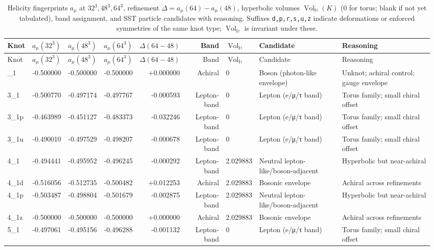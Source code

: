 \documentclass[smallextended]{svjour3}       %
\newcommand{\Vol}{\operatorname{Vol}}   %
\begin{document}
    \begin{longtable}{lrrrrrllp{6.8cm}}
    \caption{Helicity fingerprints $a_\mu$ at $32^3,48^3,64^3$, refinement $\Delta=a_\mu(64)-a_\mu(48)$, hyperbolic volumes $\Vol_{\!\mathbb{H}}(K)$ (0 for torus; blank if not yet tabulated), band assignment, and SST particle candidates with reasoning. Suffixes \texttt{d,p,r,s,u,z} indicate deformations or enforced symmetries of the same knot type; $\Vol_{\!\mathbb{H}}$ is invariant under these.}\\
    \toprule
    Knot & $a_\mu(32^3)$ & $a_\mu(48^3)$ & $a_\mu(64^3)$ & $\Delta(64{-}48)$ & Band & $\Vol_{\!\mathbb{H}}$ & Candidate & Reasoning \\
    \midrule
    \endfirsthead
    \toprule
    Knot & $a_\mu(32^3)$ & $a_\mu(48^3)$ & $a_\mu(64^3)$ & $\Delta(64{-}48)$ & Band & $\Vol_{\!\mathbb{H}}$ & Candidate & Reasoning \\
    \midrule
    \endhead
    \bottomrule
    \endlastfoot
    1\_1 & -0.500000 & -0.500000 & -0.500000 & +0.000000 & Achiral & 0 & Boson (photon-like envelope) & Unknot; achiral control; gauge envelope \\
    3\_1 & -0.500770 & -0.497174 & -0.497767 & -0.000593 & Lepton-band & 0 & Lepton (e/μ/τ band) & Torus family; small chiral offset \\
    3\_1p & -0.463989 & -0.451127 & -0.483373 & -0.032246 & Lepton-band & 0 & Lepton (e/μ/τ band) & Torus family; small chiral offset \\
    3\_1u & -0.490010 & -0.497529 & -0.498207 & -0.000678 & Lepton-band & 0 & Lepton (e/μ/τ band) & Torus family; small chiral offset \\
    4\_1 & -0.494441 & -0.495952 & -0.496245 & -0.000292 & Lepton-band & 2.029883 & Neutral lepton-like/boson-adjacent & Hyperbolic but near-achiral \\
    4\_1d & -0.516056 & -0.512735 & -0.500482 & +0.012253 & Achiral & 2.029883 & Bosonic envelope & Achiral across refinements \\
    4\_1p & -0.503487 & -0.498804 & -0.501679 & -0.002875 & Lepton-band & 2.029883 & Neutral lepton-like/boson-adjacent & Hyperbolic but near-achiral \\
    4\_1z & -0.500000 & -0.500000 & -0.500000 & +0.000000 & Achiral & 2.029883 & Bosonic envelope & Achiral across refinements \\
    5\_1 & -0.497061 & -0.495156 & -0.496288 & -0.001132 & Lepton-band & 0 & Lepton (e/μ/τ band) & Torus family; small chiral offset \\

\end{longtable}
\end{document}
